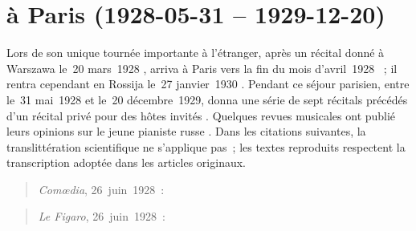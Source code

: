 \chapter[%
Vladimir Sofronickij à Paris (1928-05-31 -- 1929-12-20)][%
Vladimir Sofronickij à Paris]{%
\VSofronitsky{} à Paris (1928-05-31 -- 1929-12-20)}
\label{chap:Paris}

Lors de son unique tournée importante à l'étranger, après un récital donné à
Warszawa le~20 mars~1928 \citep[voir][p.~44]{White}, \VSofronitsky{} arriva
à Paris vers la fin du mois d'avril~1928 \citep[voir][p.~112]{White}~; il
rentra cependant en Rossija le~27 janvier~1930 \citep[voir][p.~45]{White}.
Pendant ce séjour parisien, entre le~31 mai~1928 et le~20 décembre~1929,
\VSofronitsky{} donna une série de sept récitals précédés d'un récital privé
pour des hôtes invités \citep[voir][p.~44-45, pour les programmes]{White}.
Quelques revues musicales ont publié leurs opinions sur le jeune pianiste
russe \citep[voir][p.~83]{Semaine334a}.
Dans les citations suivantes, la translittération scientifique ne s'applique
pas~; les textes reproduits respectent la transcription adoptée dans les
articles originaux.

\begin{quotation}
\end{quotation}

\begin{quotation}
 \emph{Comœdia}, 26~juin~1928~:
\end{quotation}

\begin{quotation}
 \emph{Le Figaro}, 26~juin~1928~:
\end{quotation}


